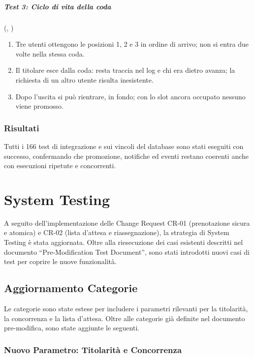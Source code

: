 \documentclass[11pt,a4paper,oneside,openany]{book}
\begin{document}
\paragraph{Test 3: Ciclo di vita della coda}
(,
)
\begin{enumerate}
  \item Tre utenti ottengono le posizioni 1, 2 e 3 in ordine di arrivo;
        non si entra due volte nella stessa coda.
  \item Il titolare esce dalla coda: resta traccia nel log e chi era dietro
        avanza; la richiesta di un altro utente risulta inesistente.
  \item Dopo l'uscita si può rientrare, in fondo; con lo slot ancora occupato
        nessuno viene promosso.
\end{enumerate}

\subsection{Risultati}

Tutti i 166 test di integrazione e sui vincoli del database sono stati
eseguiti con successo, confermando che promozione, notifiche ed eventi
restano coerenti anche con esecuzioni ripetute e concorrenti.

\chapter{System Testing}

A seguito dell'implementazione delle Change Request CR-01 (prenotazione
sicura e atomica) e CR-02 (lista d'attesa e riassegnazione), la strategia di
System Testing è stata aggiornata. Oltre alla riesecuzione dei casi esistenti
descritti nel documento \enquote{Pre-Modification Test Document}, sono stati
introdotti nuovi casi di test per coprire le nuove funzionalità.

\section{Aggiornamento Categorie}

Le categorie sono state estese per includere i parametri rilevanti per la
titolarità, la concorrenza e la lista d'attesa. Oltre alle categorie già
definite nel documento pre-modifica, sono state aggiunte le seguenti.

\subsection{Nuovo Parametro: Titolarità e Concorrenza}
\end{document}
